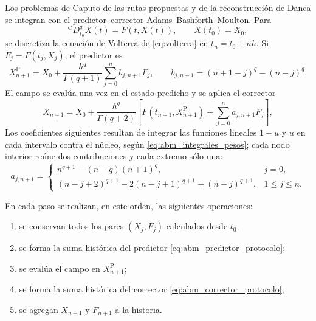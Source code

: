 Los problemas de Caputo de las rutas propuestas y de la reconstrucción de
Danca se integran con el predictor--corrector
Adams--Bashforth--Moulton. Para
\[
{}^{\mathrm C}D_{t_0}^{q}X(t)=F(t,X(t)),\qquad X(t_0)=X_0,
\]
se discretiza la ecuación de Volterra de \cref{eq:volterra} en
\(t_n=t_0+nh\). Si \(F_j=F(t_j,X_j)\), el predictor es
\begin{equation}
X_{n+1}^{\mathrm P}
=X_0+\frac{h^q}{\Gamma(q+1)}
\sum_{j=0}^{n}b_{j,n+1}F_j,
\qquad
b_{j,n+1}=(n+1-j)^q-(n-j)^q .
\label{eq:abm_predictor_protocolo}
\end{equation}
El campo se evalúa una vez en el estado predicho y se aplica el corrector
\begin{equation}
X_{n+1}
=X_0+\frac{h^q}{\Gamma(q+2)}
\left[
F(t_{n+1},X_{n+1}^{\mathrm P})
+\sum_{j=0}^{n}a_{j,n+1}F_j
\right],
\label{eq:abm_corrector_protocolo}
\end{equation}
Los coeficientes siguientes resultan de integrar las funciones lineales
\(1-u\) y \(u\) en cada intervalo contra el núcleo, según
\cref{eq:abm_integrales_pesos}; cada nodo interior reúne dos contribuciones y
cada extremo sólo una:
\begin{equation}
a_{j,n+1}=
\begin{cases}
n^{q+1}-(n-q)(n+1)^q, & j=0,\\
(n-j+2)^{q+1}-2(n-j+1)^{q+1}+(n-j)^{q+1},
&1\leq j\leq n.
\end{cases}
\label{eq:abm_pesos_protocolo}
\end{equation}

En cada paso se realizan, en este orden, las siguientes operaciones:

\begin{enumerate}
  \item se conservan todos los pares \((X_j,F_j)\) calculados desde \(t_0\);
  \item se forma la suma histórica del predictor
  \cref{eq:abm_predictor_protocolo};
  \item se evalúa el campo en \(X_{n+1}^{\mathrm P}\);
  \item se forma la suma histórica del corrector
  \cref{eq:abm_corrector_protocolo};
  \item se agregan \(X_{n+1}\) y \(F_{n+1}\) a la historia.
\end{enumerate}

